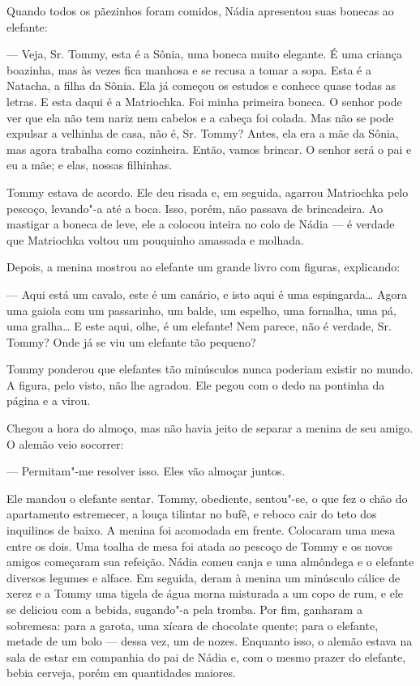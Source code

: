 Quando todos os pãezinhos foram comidos, Nádia apresentou suas bonecas
ao elefante:

--- Veja, Sr. Tommy, esta é a Sônia, uma boneca muito elegante. É uma
criança boazinha, mas às vezes fica manhosa e se recusa a tomar a sopa.
Esta é a Natacha, a filha da Sônia. Ela já começou os estudos e conhece
quase todas as letras. E esta daqui é a Matriochka. Foi minha primeira
boneca. O senhor pode ver que ela não tem nariz nem cabelos e a cabeça
foi colada. Mas não se pode expulsar a velhinha de casa, não é, Sr.
Tommy? Antes, ela era a mãe da Sônia, mas agora trabalha como
cozinheira. Então, vamos brincar. O senhor será o pai e eu a mãe; e
elas, nossas filhinhas.

Tommy estava de acordo. Ele deu risada e, em seguida, agarrou Matriochka
pelo pescoço, levando"-a até a boca. Isso, porém, não passava de
brincadeira. Ao mastigar a boneca de leve, ele a colocou inteira no colo
de Nádia --- é verdade que Matriochka voltou um pouquinho amassada e
molhada.

Depois, a menina mostrou ao elefante um grande livro com figuras,
explicando:

--- Aqui está um cavalo, este é um canário, e isto aqui é uma
espingarda\ldots{} Agora uma gaiola com um passarinho, um balde, um espelho,
uma fornalha, uma pá, uma gralha\ldots{} E este aqui, olhe, é um elefante!
Nem parece, não é verdade, Sr. Tommy? Onde já se viu um elefante tão
pequeno?

Tommy ponderou que elefantes tão minúsculos nunca poderiam existir no
mundo. A figura, pelo visto, não lhe agradou. Ele pegou com o dedo na
pontinha da página e a virou.

Chegou a hora do almoço, mas não havia jeito de separar a menina de seu
amigo. O alemão veio socorrer:

--- Permitam"-me resolver isso. Eles vão almoçar juntos.

Ele mandou o elefante sentar. Tommy, obediente, sentou"-se, o que fez o
chão do apartamento estremecer, a louça tilintar no bufê, e reboco cair
do teto dos inquilinos de baixo. A menina foi acomodada em frente.
Colocaram uma mesa entre os dois. Uma toalha de mesa foi atada ao
pescoço de Tommy e os novos amigos começaram sua refeição. Nádia comeu
canja e uma almôndega e o elefante diversos legumes e alface. Em
seguida, deram à menina um minúsculo cálice de xerez e a Tommy uma
tigela de água morna misturada a um copo de rum, e ele se deliciou com a
bebida, sugando"-a pela tromba. Por fim, ganharam a sobremesa: para a
garota, uma xícara de chocolate quente; para o elefante, metade de um
bolo --- dessa vez, um de nozes. Enquanto isso, o alemão estava na sala
de estar em companhia do pai de Nádia e, com o mesmo prazer do elefante,
bebia cerveja, porém em quantidades maiores.

